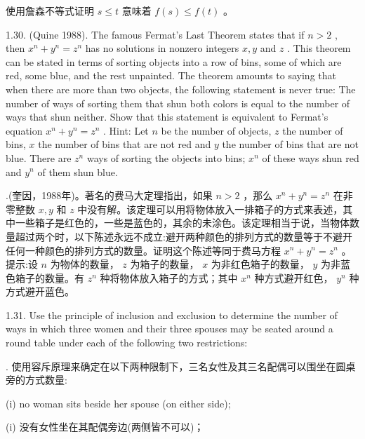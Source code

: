 \documentclass[10pt]{article}
\begin{document}
\begin{tcolorbox}\relax
使用詹森不等式证明 \(s \leq  t\) 意味着 \(f\left( s\right)  \leq  f\left( t\right)\) 。
\end{tcolorbox}

1.30. (Quine 1988). The famous Fermat's Last Theorem states that if \(n > 2\) , then \({x}^{n} + {y}^{n} = {z}^{n}\) has no solutions in nonzero integers \(x,y\) and \(z\) . This theorem can be stated in terms of sorting objects into a row of bins, some of which are red, some blue, and the rest unpainted. The theorem amounts to saying that when there are more than two objects, the following statement is never true: The number of ways of sorting them that shun both colors is equal to the number of ways that shun neither. Show that this statement is equivalent to Fermat’s equation \({x}^{n} + {y}^{n} = {z}^{n}\) . Hint: Let \(n\) be the number of objects, \(z\) the number of bins, \(x\) the number of bins that are not red and \(y\) the number of bins that are not blue. There are \({z}^{n}\) ways of sorting the objects into bins; \({x}^{n}\) of these ways shun red and \({y}^{n}\) of them shun blue.

\begin{tcolorbox}.(奎因，1988年)。著名的费马大定理指出，如果 \(n > 2\) ，那么 \({x}^{n} + {y}^{n} = {z}^{n}\) 在非零整数 \(x,y\) 和 \(z\) 中没有解。该定理可以用将物体放入一排箱子的方式来表述，其中一些箱子是红色的，一些是蓝色的，其余的未涂色。该定理相当于说，当物体数量超过两个时，以下陈述永远不成立:避开两种颜色的排列方式的数量等于不避开任何一种颜色的排列方式的数量。证明这个陈述等同于费马方程 \({x}^{n} + {y}^{n} = {z}^{n}\) 。提示:设 \(n\) 为物体的数量， \(z\) 为箱子的数量， \(x\) 为非红色箱子的数量， \(y\) 为非蓝色箱子的数量。有 \({z}^{n}\) 种将物体放入箱子的方式；其中 \({x}^{n}\) 种方式避开红色， \({y}^{n}\) 种方式避开蓝色。
\end{tcolorbox}

1.31. Use the principle of inclusion and exclusion to determine the number of ways in which three women and their three spouses may be seated around a round table under each of the following two restrictions:

\begin{tcolorbox}. 使用容斥原理来确定在以下两种限制下，三名女性及其三名配偶可以围坐在圆桌旁的方式数量:
\end{tcolorbox}

(i) no woman sits beside her spouse (on either side);

\begin{tcolorbox}\relax
(i) 没有女性坐在其配偶旁边(两侧皆不可以)；
\end{tcolorbox}
\end{document}
